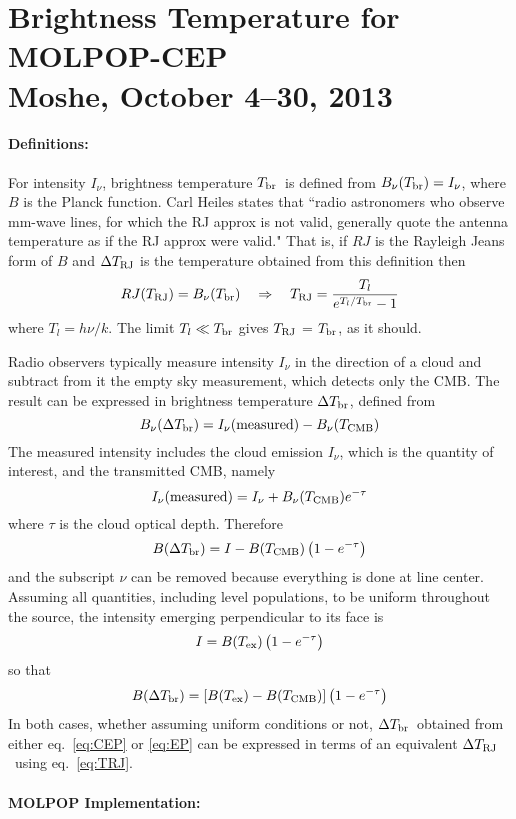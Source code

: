 \documentclass[preprint,12pt]{aastex}
\def\eq#1{\begin{equation} #1 \end{equation}}
\def\Tcmb     {\hbox{$T_{\rm CMB}$}}
\def\TRJ      {\hbox{$T_{\rm RJ}$}}
\def\Tb       {\hbox{$T_{\rm br}$}}
\def\Tbr      {\hbox{$\Delta T_{\rm br}$}}
\def\TRJ      {\hbox{$\Delta T_{\rm RJ}$}}
\def\Tx       {\hbox{$T_{\rm ex}$}}
\begin{document}
\thispagestyle{empty}

\section*{Brightness Temperature for MOLPOP-CEP\\
  Moshe, October 4--30, 2013}

\paragraph{Definitions:}

For intensity $I_\nu$, brightness temperature \Tb\ is defined from $B_\nu(\Tb)
= I_\nu$, where $B$ is the Planck function. Carl Heiles states that ``radio
astronomers who observe mm-wave lines, for which the RJ approx is not valid,
generally quote the antenna temperature as if the RJ approx were valid." That
is, if $RJ$ is the Rayleigh Jeans form of $B$ and $\TRJ$ is the temperature
obtained from this definition then
\eq{\label{eq:TRJ}
   RJ(T_{\rm RJ}) = B_\nu(\Tb)     \quad \Rightarrow \quad
   T_{\rm RJ} = \frac{T_l}{e^{T_l/T_{\rm br}} - 1}
}
where $T_l = h\nu/k$. The limit $T_l \ll \Tb$ gives $T_{\rm RJ}$ = \Tb, as it
should.

Radio observers typically measure intensity $I_\nu$ in the direction of a cloud
and subtract from it the empty sky measurement, which detects only the CMB. The
result can be expressed in brightness temperature \Tbr, defined from
\eq{
   B_\nu(\Tbr) = I_\nu({\rm measured}) - B_\nu(\Tcmb)
}
The measured intensity includes the cloud emission $I_\nu$, which is the
quantity of interest, and the transmitted CMB, namely
\eq{
  I_\nu({\rm measured}) = I_\nu + B_\nu(\Tcmb)e^{-\tau}
}
where $\tau$ is the cloud optical depth. Therefore
\eq{\label{eq:CEP}
  B(\Tbr) = I - B(\Tcmb)\left(1 -  e^{-\tau}\right)
}
and the subscript $\nu$ can be removed because everything is done at line
center. Assuming all quantities, including level populations, to be uniform
throughout the source, the intensity emerging perpendicular to its face is
\eq{
       I = B(\Tx)\left(1 -  e^{-\tau}\right)
}
so that
\eq{\label{eq:EP}
  B(\Tbr) = \left[B(\Tx) - B(\Tcmb) \right] \left(1 -  e^{-\tau}\right)
}
In both cases, whether assuming uniform conditions or not, \Tbr\ obtained from
either eq.\ \ref{eq:CEP} or \ref{eq:EP} can be expressed in terms of an
equivalent \TRJ\ using eq.\ \ref{eq:TRJ}.


\paragraph{MOLPOP Implementation:}
\end{document}

